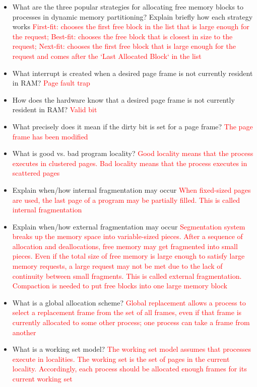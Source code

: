 \documentclass[9pt,landscape]{memoir}
\newcommand{\answer}[1]{\textcolor{red}{#1}}
\begin{document}
\begin{multicols}{6}
\begin{itemize}
    \item What are the three popular strategies for allocating free memory blocks to processes in dynamic memory partitioning? Explain briefly how each strategy works \answer{First-fit: chooses the first free block in the list that is large enough for the request; Best-fit: chooses the free block that is closest in size to the request; Next-fit: chooses the first free block that is large enough for the request and comes after the `Last Allocated Block` in the list}
    \item What interrupt is created when a desired page frame is not currently resident in RAM?  \answer{Page fault trap}
    \item How does the hardware know that a desired page frame is not currently resident in RAM?  \answer{Valid bit}
    \item What precisely does it mean if the dirty bit is set for a page frame?  \answer{The page frame has been modified}
    \item What is good vs. bad program locality?  \answer{Good locality means that the process executes in clustered pages. Bad locality means that the process executes in scattered pages}
    \item Explain when/how internal fragmentation may occur \answer{When fixed-sized pages are used, the last page of a program may be partially filled. This is called internal fragmentation}
    \item Explain when/how external fragmentation may occur \answer{Segmentation system breaks up the memory space into variable-sized pieces. After a sequence of allocation and deallocations, free memory may get fragmented into small pieces. Even if the total size of free memory is large enough to satisfy large memory requests, a large request may not be met due to the lack of continuity between small fragments. This is called external fragmentation. Compaction is needed to put free blocks into one large memory block}
    \item What is a global allocation scheme?  \answer{Global replacement allows a process to select a replacement frame from the set of all frames, even if that frame is currently allocated to some other process; one process can take a frame from another}
    \item What is a working set model?  \answer{The working set model assumes that processes execute in localities. The working set is the set of pages in the current locality. Accordingly, each process should be allocated enough frames for its current working set}

\end{itemize}
\end{multicols}
\end{document}
